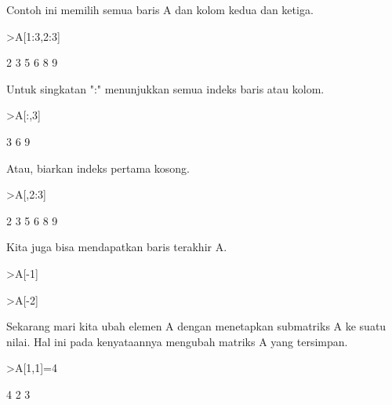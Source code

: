 \documentclass[a4paper,10pt]{article}
\begin{document}
\begin{eulernotebook}
\begin{eulercomment}
\begin{eulercomment}
\begin{eulercomment}
\begin{eulercomment}
\begin{eulercomment}
\begin{eulercomment}
\begin{eulercomment}
Contoh ini memilih semua baris A dan kolom kedua dan ketiga.
\end{eulercomment}
\begin{eulerprompt}
>A[1:3,2:3]
\end{eulerprompt}
\begin{euleroutput}
              2             3 
              5             6 
              8             9 
\end{euleroutput}
\begin{eulercomment}
Untuk singkatan ":" menunjukkan semua indeks baris atau kolom.
\end{eulercomment}
\begin{eulerprompt}
>A[:,3]
\end{eulerprompt}
\begin{euleroutput}
              3 
              6 
              9 
\end{euleroutput}
\begin{eulercomment}
Atau, biarkan indeks pertama kosong.
\end{eulercomment}
\begin{eulerprompt}
>A[,2:3]
\end{eulerprompt}
\begin{euleroutput}
              2             3 
              5             6 
              8             9 
\end{euleroutput}
\begin{eulercomment}
Kita juga bisa mendapatkan baris terakhir A.
\end{eulercomment}
\begin{eulerprompt}
>A[-1]
\end{eulerprompt}
\begin{euleroutput}
  [5,  6,  7,  8]
\end{euleroutput}
\begin{eulerprompt}
>A[-2]
\end{eulerprompt}
\begin{euleroutput}
  [1,  2,  3,  4]
\end{euleroutput}
\begin{eulercomment}
Sekarang mari kita ubah elemen A dengan menetapkan submatriks A ke
suatu nilai. Hal ini pada kenyataannya mengubah matriks A yang
tersimpan.
\end{eulercomment}
\begin{eulerprompt}
>A[1,1]=4
\end{eulerprompt}
\begin{euleroutput}
              4             2             3 

\end{euleroutput}
\end{eulercomment}
\end{eulercomment}
\end{eulercomment}
\end{eulercomment}
\end{eulercomment}
\end{eulercomment}
\end{eulernotebook}
\end{document}
